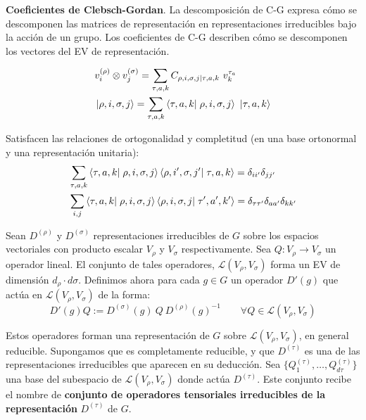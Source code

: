 \begin{flushleft}
\textbf{Coeficientes de Clebsch-Gordan}. La descomposición de C-G expresa cómo se descomponen las matrices de representación en representaciones irreducibles bajo la acción de un grupo. Los coeficientes de C-G describen cómo se descomponen los vectores del EV de representación.
\end{flushleft}
\begin{subequations}
\begin{flalign}
&v_i^{(\rho)}\otimes v_j^{(\sigma)}=\sum_{\tau,a,k} C_{\rho,i,\sigma,j|\tau,a,k}\ v_k^{\tau_a}\\
&\left|\rho,i,\sigma,j\right\rangle=\sum_{\tau,a,k} \left\langle\tau,a,k\right|\left.\rho,i,\sigma,j\right\rangle\ \left|\tau, a, k\right\rangle
\end{flalign}
\end{subequations}

Satisfacen las relaciones de ortogonalidad y completitud (en una base ortonormal y una representación unitaria):
\begin{subequations}
\begin{flalign}
&\sum_{\tau,a,k}\left\langle\tau,a,k\right|\left.\rho,i,\sigma,j\right\rangle\left\langle\rho,i',\sigma,j'\right|\left.\tau,a,k\right\rangle=\delta_{ii'}\delta_{jj'}\\
&\sum_{i,j}\left\langle\tau,a,k\right|\left.\rho,i,\sigma,j\right\rangle\left\langle\rho,i,\sigma,j\right|\left.\tau',a',k'\right\rangle=\delta_{\tau\tau'}\delta_{aa'}\delta_{kk'}
\end{flalign}
\end{subequations}


\begin{definicion}
Sean $D^{(\rho)}$ y $D^{(\sigma)}$ representaciones irreducibles de $G$ sobre los espacios vectoriales con producto escalar $V_\rho$ y $V_\sigma$ respectivamente. Sea $Q:V_\rho\rightarrow V_\sigma$ un operador lineal. El conjunto de tales operadores, $\mathcal{L}(V_\rho,V_\sigma)$ forma un EV de dimensión $d_\rho \cdot d\sigma$. Definimos ahora para cada $g\in G$ un operador $D'(g)$ que actúa en $\mathcal{L}(V_\rho,V_\sigma)$ de la forma:
\begin{equation}
D'(g)Q:=D^{(\sigma)}(g)\ Q\ D^{(\rho)}(g)^{-1}\qquad \forall Q\in \mathcal{L}(V_\rho,V_\sigma)
\end{equation}

Estos operadores forman una representación de $G$ sobre $\mathcal{L}(V_\rho,V_\sigma)$, en general reducible. Supongamos que es completamente reducible, y que $D^{(\tau)}$ es una de las representaciones irreducibles que aparecen en su deducción. Sea $\{Q_1^{(\tau)},\ldots,Q_{d\tau}^{(\tau)}\}$ una base del subespacio de $\mathcal{L}(V_\rho,V_\sigma)$ donde actúa $D^{(\tau)}$. Este conjunto recibe el nombre de \textbf{conjunto de operadores tensoriales irreducibles de la representación} $D^{(\tau)}$ de $G$. 
\end{definicion}

